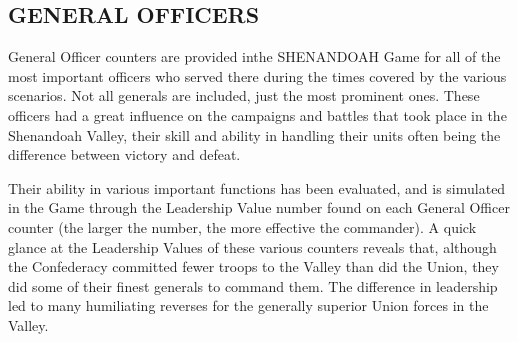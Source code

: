 \subsection{GENERAL OFFICERS}

General Officer counters are provided inthe SHENANDOAH Game for all of the most important officers who served there during the times covered by the various scenarios. Not all generals are included, just the most prominent ones. These officers had a great influence on the campaigns and battles that took place in the Shenandoah Valley, their skill and ability in handling their units often being the difference between victory and defeat.

Their ability in various important functions has been evaluated, and is simulated in the Game through the Leadership Value number found on each General Officer counter (the larger the number, the more effective the commander). A quick glance at the Leadership Values of these various counters reveals that, although the Confederacy committed fewer troops to the Valley than did the Union, they did some of their finest generals to command them. The difference in leadership led to many humiliating reverses for the generally superior Union forces in the Valley.

